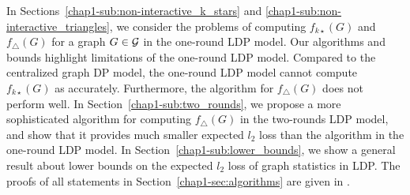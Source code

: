 % 

In 
Sections~\ref{chap1-sub:non-interactive_k_stars} and \ref{chap1-sub:non-interactive_triangles}, 
we consider the problems of computing $f_{k\star}(G)$ 
and $f_\triangle(G)$ 
for a graph $G \in \mathcal{G}$ in the 
one-round 
LDP model. 
Our algorithms and bounds highlight limitations of the
one-round 
LDP model. Compared to the centralized graph DP model, the
one-round 
LDP model cannot compute $f_{k\star}(G)$ as accurately.
Furthermore, the algorithm for $f_\triangle(G)$ does not perform 
well. 
In Section~\ref{chap1-sub:two_rounds}, we propose a more sophisticated algorithm for computing  $f_\triangle(G)$ in the two-rounds LDP model, and show that it provides much smaller expected $l_2$ loss than the algorithm in the one-round LDP model.
In Section~\ref{chap1-sub:lower_bounds}, we show a general result about lower bounds on the expected $l_2$ loss of graph statistics in LDP. 
The proofs of all statements in Section~\ref{chap1-sec:algorithms} are given in 
.

